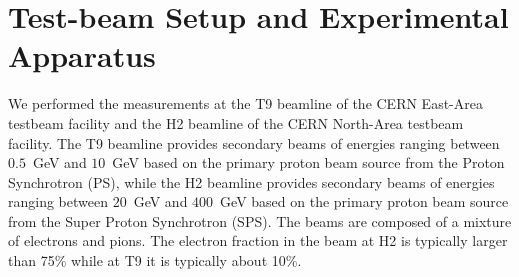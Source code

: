 \section{Test-beam Setup and Experimental Apparatus }
\label{sec:tbeam}

We performed the measurements at the T9 beamline of the CERN East-Area testbeam facility and 
the H2 beamline of the CERN North-Area testbeam facility. The T9 beamline provides secondary 
beams of energies ranging between $0.5$~GeV and $10$~GeV based on the primary proton beam source 
from the Proton Synchrotron (PS), while the H2 beamline provides secondary beams of energies 
ranging between $20$~GeV and $400$~GeV based on the primary proton beam source from the Super 
Proton Synchrotron (SPS). The beams are composed of 
a mixture of electrons and pions. The electron fraction in the beam at H2 is typically larger than 75\%
while at T9 it is typically about 10\%. 

